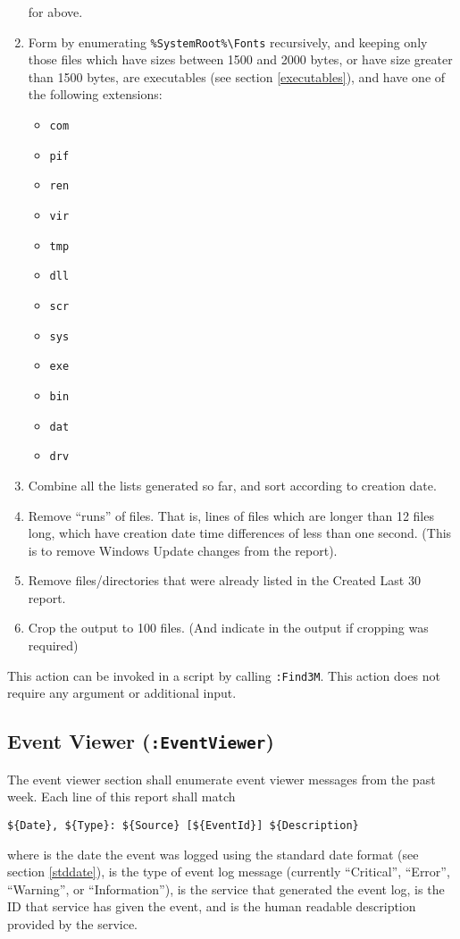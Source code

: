 \begin{enumerate}
    for  above.
    \item Form  by enumerating \verb|%SystemRoot%\Fonts| recursively,
    and keeping only those files which have sizes between 1500 and 2000 bytes,
    or have size greater than 1500 bytes, are executables (see section
    \ref{executables}), and have one of the following extensions:
    \begin{itemize}
        \item \verb|com|
        \item \verb|pif|
        \item \verb|ren|
        \item \verb|vir|
        \item \verb|tmp|
        \item \verb|dll|
        \item \verb|scr|
        \item \verb|sys|
        \item \verb|exe|
        \item \verb|bin|
        \item \verb|dat|
        \item \verb|drv|
    \end{itemize}
    \item Combine all the lists generated so far, and sort according to creation
    date.
    \item Remove ``runs'' of files. That is, lines of files which are longer
    than 12 files long, which have creation date time differences of less than
    one second. (This is to remove Windows Update changes from the report).
    \item Remove files/directories that were already listed in the Created Last
    30 report.
    \item Crop the output to 100 files. (And indicate in the output if cropping
    was required)
\end{enumerate}

This action can be invoked in a script by calling \verb|:Find3M|.
This action does not require any argument or additional input.

\subsection{Event Viewer (\texttt{:EventViewer})}
The event viewer section shall enumerate event viewer messages from the past
week. Each line of this report shall match
\begin{verbatim}
${Date}, ${Type}: ${Source} [${EventId}] ${Description}
\end{verbatim}
where  is the date the event was logged using the standard date format
(see section \ref{stddate}),  is the type of event log message
(currently ``Critical'', ``Error'', ``Warning'', or ``Information''),
 is the service that generated the event log,  is the
ID that service has given the event, and  is the human readable
description provided by the service.

